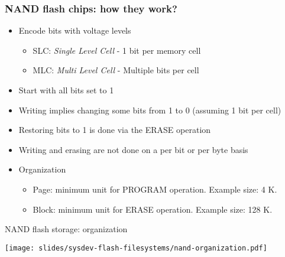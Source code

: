 \begin{frame}
  \frametitle{NAND flash chips: how they work?}
  \begin{itemize}
  \item Encode bits with voltage levels
    \begin{itemize}
      \item SLC: {\em Single Level Cell} - 1 bit per memory cell
      \item MLC: {\em Multi Level Cell} - Multiple bits per cell
    \end{itemize}
  \item Start with all bits set to 1
  \item Writing implies changing some bits from 1 to 0
        (assuming 1 bit per cell)
  \item Restoring bits to 1 is done via the ERASE operation
  \item Writing and erasing are not done on a per bit or per byte
    basis
  \item Organization
    \begin{itemize}
    \item Page: minimum unit for PROGRAM operation. Example size: 4 K.
    \item Block: minimum unit for ERASE operation. Example size: 128 K.
    \end{itemize}
  \end{itemize}
\end{frame}

\begin{frame}{NAND flash storage: organization}
  \begin{center}
    \texttt{[image: slides/sysdev-flash-filesystems/nand-organization.pdf]}
  \end{center}
\end{frame}

